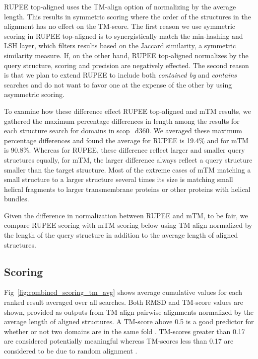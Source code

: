 \documentclass[10pt,letterpaper]{article}
\renewcommand{\figurename}{Fig}
\begin{document}
RUPEE top-aligned uses the TM-align option of normalizing by the average length. 
This results in symmetric scoring where the order of the structures in the alignment has no effect on the TM-score.
The first reason we use symmetric scoring in RUPEE top-aligned is to synergistically match the min-hashing and LSH layer, which filters results based on the Jaccard similarity, a symmetric similarity measure.
If, on the other hand, RUPEE top-aligned normalizes by the query structure, scoring and precision are negatively effected. 
The second reason is that we plan to extend RUPEE to include both \emph{contained by} and \emph{contains} searches and do not want to favor one at the expense of the other by using asymmetric scoring. 

To examine how these difference effect RUPEE top-aligned and mTM results, we gathered the maximum percentage differences in length among the results for each structure search for domains in scop\_d360.
We averaged these maximum percentage differences and found the average for RUPEE is 19.4\% and for mTM is 90.8\%. 
Whereas for RUPEE, these difference reflect larger and smaller query structures equally, for mTM, the larger difference always reflect a query structure smaller than the target structure. 
Most of the extreme cases of mTM matching a small structure to a larger structure several times its size is matching small helical fragments to larger transmembrane proteins or other proteins with helical bundles. 

Given the difference in normalization between RUPEE and mTM, to be fair, we compare RUPEE scoring with mTM scoring below using TM-align normalized by the length of the query structure in addition to the average length of aligned structures. 

\subsection*{Scoring}

\figurename~\ref{fig:combined_scoring_tm_avg} shows average cumulative values for each ranked result averaged over all searches.
Both RMSD and TM-score values are shown, provided as outputs from TM-align pairwise alignments normalized by the average length of aligned structures.
A TM-score above 0.5 is a good predictor for whether or not two domains are in the same fold \cite{Xu2010}.
TM-scores greater than 0.17 are considered potentially meaningful whereas TM-scores less than 0.17 are considered to be due to random alignment \cite{Zhang2004}.
\end{document}
